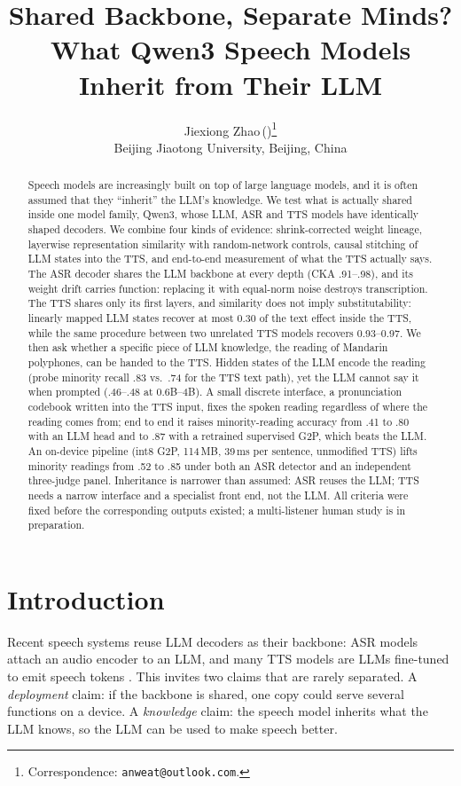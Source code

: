 \documentclass[11pt]{article}
\title{Shared Backbone, Separate Minds?\\What Qwen3 Speech Models Inherit from Their LLM}
\author{%
  Jiexiong Zhao\,(\zh{赵杰雄})\thanks{Correspondence: \texttt{anweat@outlook.com}.}\\
  Beijing Jiaotong University, Beijing, China
}
\date{}
\begin{document}
\maketitle

\begin{abstract}
Speech models are increasingly built on top of large language models, and it is often assumed that they ``inherit'' the LLM's knowledge. We test what is actually shared inside one model family, Qwen3, whose LLM, ASR and TTS models have identically shaped decoders. We combine four kinds of evidence: shrink-corrected weight lineage, layerwise representation similarity with random-network controls, causal stitching of LLM states into the TTS, and end-to-end measurement of what the TTS actually says. The ASR decoder shares the LLM backbone at every depth (CKA .91--.98), and its weight drift carries function: replacing it with equal-norm noise destroys transcription. The TTS shares only its first layers, and similarity does not imply substitutability: linearly mapped LLM states recover at most 0.30 of the text effect inside the TTS, while the same procedure between two unrelated TTS models recovers 0.93--0.97. We then ask whether a specific piece of LLM knowledge, the reading of Mandarin polyphones, can be handed to the TTS. Hidden states of the LLM encode the reading (probe minority recall .83 vs.\ .74 for the TTS text path), yet the LLM cannot say it when prompted (.46--.48 at 0.6B--4B). A small discrete interface, a pronunciation codebook written into the TTS input, fixes the spoken reading regardless of where the reading comes from; end to end it raises minority-reading accuracy from .41 to .80 with an LLM head and to .87 with a retrained supervised G2P, which beats the LLM. An on-device pipeline (int8 G2P, 114\,MB, 39\,ms per sentence, unmodified TTS) lifts minority readings from .52 to .85 under both an ASR detector and an independent three-judge panel. Inheritance is narrower than assumed: ASR reuses the LLM; TTS needs a narrow interface and a specialist front end, not the LLM. All criteria were fixed before the corresponding outputs existed; a multi-listener human study is in preparation.
\end{abstract}

\section{Introduction}

Recent speech systems reuse LLM decoders as their backbone: ASR models attach an audio encoder to an LLM, and many TTS models are LLMs fine-tuned to emit speech tokens \citep{qwenaudio,qwen2audio,cosyvoice2,sparktts,llasa}. This invites two claims that are rarely separated. A \emph{deployment} claim: if the backbone is shared, one copy could serve several functions on a device. A \emph{knowledge} claim: the speech model inherits what the LLM knows, so the LLM can be used to make speech better.
\end{document}
